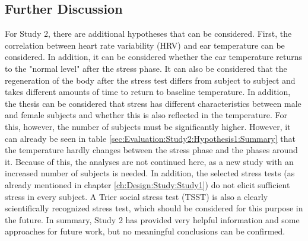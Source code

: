 \subsection{Further Discussion}
For Study 2, there are additional hypotheses that can be considered. 
First, the correlation between heart rate variability (HRV) and ear temperature can be considered. 
In addition, it can be considered whether the ear temperature returns to the "normal level" after the stress phase.
It can also be considered that the regeneration of the body after the stress test differs from subject to subject and takes different amounts of time to return to baseline temperature.
In addition, the thesis can be considered that stress has different characteristics between male and female subjects and whether this is also reflected in the temperature.
For this, however, the number of subjects must be significantly higher.
However, it can already be seen in table \ref{sec:Evaluation:Study2:Hypothesis1:Summary} that the temperature hardly changes between the stress phase and the phases around it. 
Because of this, the analyses are not continued here, as a new study with an increased number of subjects is needed.
In addition, the selected stress tests (as already mentioned in chapter \ref{ch:Design:Study:Study1}) do not elicit sufficient stress in every subject.
A Trier social stress test (TSST) is also a clearly scientifically recognized stress test, which should be considered for this purpose in the future.
In summary, Study 2 has provided very helpful information and some approaches for future work, but no meaningful conclusions can be confirmed.